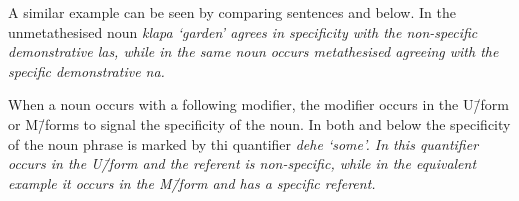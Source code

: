 \begin{exe}\let\eachwordone=\itshape
	\label{ex:KatBukuEneng}
\end{exe}
\newpage
\begin{exe}\let\eachwordone=\itshape
	\label{ex:KatTotoangBuuk}
	\label{ex:*KatTotoangBuuk}
\end{exe}

A similar example can be seen by comparing
sentences  and  below.
In  the unmetathesised noun \it{klapa} `garden' agrees
in specificity with the non-specific demonstrative \it{las},
while in  the same noun occurs metathesised
agreeing with the specific demonstrative \it{na}.

\begin{exe}\let\eachwordone=\itshape
	\label{ex:NolKlapaLas}
	\label{ex:OenTamasLakos}
\end{exe}

When a noun occurs with a following modifier,
the modifier occurs in the U\=/form or M\=/forms
to signal the specificity of the noun.
In both  and  below
the specificity of the noun phrase is marked by thi quantifier \it{dehe} `some'.
In  this quantifier occurs in the U\=/form
and the referent is non-specific,
while in the equivalent example  it occurs in the M\=/form
and has a specific referent.

